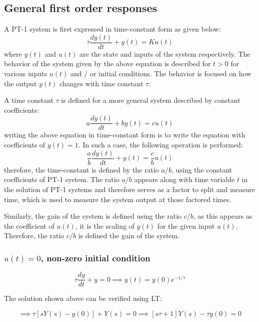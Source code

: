 \subsection{General first order responses}

A PT-1 system is first expressed in time-constant form as given below:
\begin{equation}
	\tau \frac{dy(t)}{dt} + y(t) = K u(t)
\end{equation}
where $y(t)$ and $u(t)$ are the state and inputs of the system respectively. The behavior of the system given by the above equation is described for $t > 0$ for various inputs $u(t)$ and / or initial conditions. The behavior is focused on how the output $y(t)$ changes with time constant $\tau$.

A time constant $\tau$ is defined for a more general system described by constant coefficients:
\begin{equation}
	a \frac{dy(t)}{dt} + b y(t) = c u(t)
\end{equation}
writing the above equation in time-constant form is to write the equation with coefficients of $y(t) = 1$. In such a case, the following operation is performed:
\begin{equation}
	\frac{a}{b} \frac{dy(t)}{dt} + y(t) = \frac{c}{b} u(t)
\end{equation}
therefore, the time-constant is defined by the ratio $a/b$, using the constant coefficients of PT-1 system. The ratio $a/b$ appears along with time variable $t$ in the solution of PT-1 systems and therefore serves as a factor to split and measure time, which is used to measure the system output at those factored times.

Similarly, the gain of the system is defined using the ratio $c/b$, as this appears as the coefficient of $u(t)$, it is the scaling of $y(t)$ for the given input $u(t)$. Therefore, the ratio $c/b$ is defined the gain of the system.

\subsubsection{$u(t) = 0$, non-zero initial condition}

\begin{equation}
	\tau \frac{dy}{dt} + y = 0 \implies y(t) = y(0) e^{-1/\tau}
\end{equation}

The solution shown above can be verified using LT:

\begin{equation}
	\implies \tau [s Y(s) - y(0)] + Y(s) = 0 \implies [s \tau + 1] Y(s) - \tau y(0) = 0
\end{equation}

